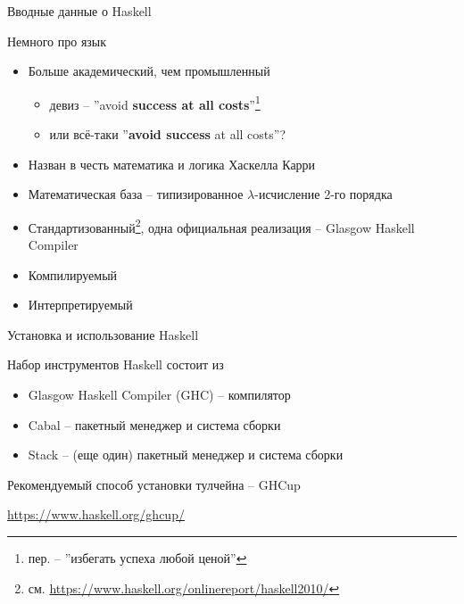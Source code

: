 \documentclass{beamer}
\begin{document}
  \begin{frame}{Вводные данные о Haskell}
      \begin{block}{Немного про язык}
        \begin{itemize}
            \item Больше академический, чем промышленный
                \begin{itemize}
                    \item девиз -- ''avoid \textbf{success at all costs}''\footnote{пер. -- ''избегать успеха любой ценой''}
                    \item или всё-таки ''\textbf{avoid success} at all costs''?
                \end{itemize}
            \item Назван в честь математика и логика Хаскелла Карри
            \item Математическая база -- типизированное $\lambda$-исчисление 2-го порядка
            \item Стандартизованный\footnote{см. \alert{\href{Haskell2010}{https://www.haskell.org/onlinereport/haskell2010/}}}, одна официальная реализация -- Glasgow Haskell Compiler
            \item Компилируемый
            \item Интерпретируемый
        \end{itemize}
      \end{block}
  \end{frame}
  \begin{frame}{Установка и использование Haskell}
      \begin{block}{Набор инструментов Haskell состоит из}
\begin{itemize}
    \item Glasgow Haskell Compiler (GHC) -- компилятор
    \item Cabal -- пакетный менеджер и система сборки
    \item Stack -- (еще один) пакетный менеджер и система сборки
\end{itemize}
      \end{block}
      \begin{block}{Рекомендуемый способ установки тулчейна -- GHCup}
        
        \center\alert{{\url{https://www.haskell.org/ghcup/}}}
      \end{block}
  \end{frame}
\end{document}
